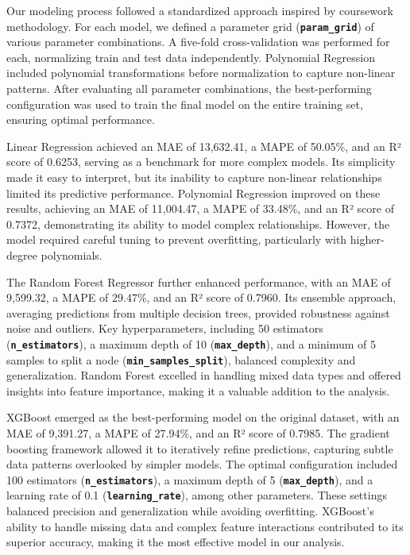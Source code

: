 \documentclass[a4paper,oneside,bibliography=totoc]{scrbook}
\begin{document}
Our modeling process followed a standardized approach inspired by coursework methodology. For each model, we defined a parameter grid (\textbf{\texttt{param\_grid}}) of various parameter combinations. A five-fold cross-validation was performed for each, normalizing train and test data independently. Polynomial Regression included polynomial transformations before normalization to capture non-linear patterns. After evaluating all parameter combinations, the best-performing configuration was used to train the final model on the entire training set, ensuring optimal performance.

Linear Regression achieved an MAE of 13,632.41, a MAPE of 50.05\%, and an R² score of 0.6253, serving as a benchmark for more complex models. Its simplicity made it easy to interpret, but its inability to capture non-linear relationships limited its predictive performance. Polynomial Regression improved on these results, achieving an MAE of 11,004.47, a MAPE of 33.48\%, and an R² score of 0.7372, demonstrating its ability to model complex relationships. However, the model required careful tuning to prevent overfitting, particularly with higher-degree polynomials.

The Random Forest Regressor further enhanced performance, with an MAE of 9,599.32, a MAPE of 29.47\%, and an R² score of 0.7960. Its ensemble approach, averaging predictions from multiple decision trees, provided robustness against noise and outliers. Key hyperparameters, including 50 estimators (\textbf{\texttt{n\_estimators}}), a maximum depth of 10 (\textbf{\texttt{max\_depth}}), and a minimum of 5 samples to split a node (\textbf{\texttt{min\_samples\_split}}), balanced complexity and generalization. Random Forest excelled in handling mixed data types and offered insights into feature importance, making it a valuable addition to the analysis.

XGBoost emerged as the best-performing model on the original dataset, with an MAE of 9,391.27, a MAPE of 27.94\%, and an R² score of 0.7985. The gradient boosting framework allowed it to iteratively refine predictions, capturing subtle data patterns overlooked by simpler models. The optimal configuration included 100 estimators (\textbf{\texttt{n\_estimators}}), a maximum depth of 5 (\textbf{\texttt{max\_depth}}), and a learning rate of 0.1 (\textbf{\texttt{learning\_rate}}), among other parameters. These settings balanced precision and generalization while avoiding overfitting. XGBoost's ability to handle missing data and complex feature interactions contributed to its superior accuracy, making it the most effective model in our analysis.
\end{document}

